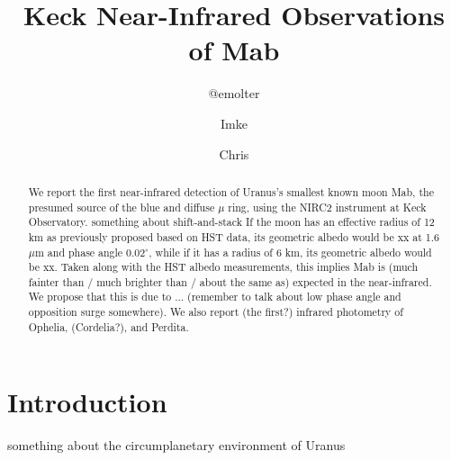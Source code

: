 \documentclass[preprint]{aastex631}
\begin{document}
	
\newcommand{\ergsec}{erg s$^{-1}$ cm$^{-2}$ $\mu$m$^{-1}$\ }

\title{Keck Near-Infrared Observations of Mab}

\author{@emolter}

\author{Imke}

\author{Chris}


\begin{abstract}
We report the first near-infrared detection of Uranus's smallest known moon Mab, the presumed source of the blue and diffuse $\mu$ ring, using the NIRC2 instrument at Keck Observatory.
something about shift-and-stack
If the moon has an effective radius of 12 km as previously proposed based on HST data, its geometric albedo would be xx at 1.6 $\mu$m and phase angle 0.02$^\circ$, while if it has a radius of 6 km, its geometric albedo would be xx. Taken along with the HST albedo measurements, this implies Mab is (much fainter than / much brighter than / about the same as) expected in the near-infrared. We propose that this is due to ... (remember to talk about low phase angle and opposition surge somewhere). We also report (the first?) infrared photometry of Ophelia, (Cordelia?), and Perdita.
\end{abstract}

\section{Introduction}
\label{s:intro}

something about the circumplanetary environment of Uranus
\end{document}
